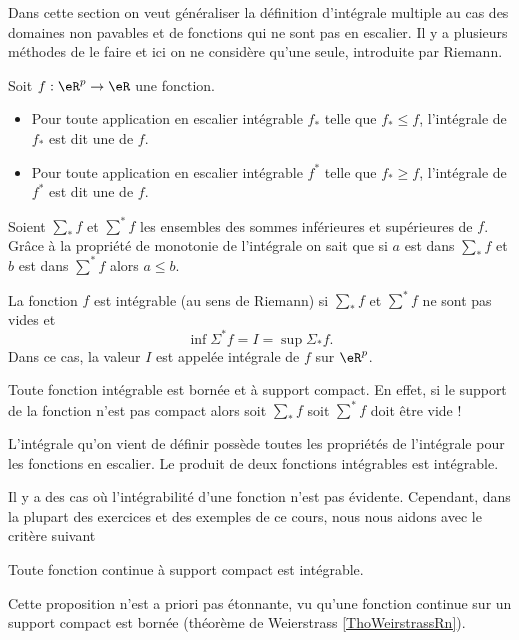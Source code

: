 Dans cette section on veut généraliser la définition d'intégrale multiple au cas des domaines non pavables et de fonctions qui ne sont pas en escalier. Il y a plusieurs méthodes de le faire et ici on ne considère qu'une seule, introduite par Riemann.  
\begin{definition} Soit $f: \eR^p\to \eR$ une fonction.
  \begin{itemize}
	  \item Pour toute application en escalier intégrable $f_*$ telle que $f_*\leq f$, l'intégrale de $f_*$ est dit une  de $f$. 
	  \item Pour toute application en escalier intégrable $f^*$ telle que $f_*\geq f$, l'intégrale de $f^*$ est dit une  de $f$. 
  \end{itemize}
\end{definition}
Soient $\sum_* f$ et  $\sum^* f$ les ensembles des sommes inférieures et supérieures de $f$. Grâce à la propriété de  monotonie de l'intégrale on sait que si $a$ est dans $\sum_* f$ et  $b$ est dans $\sum^* f$ alors $a\leq b$. 
\begin{definition}
  La fonction $f$ est intégrable (au sens de Riemann) si $\sum_* f$ et  $\sum^* f$ ne sont pas vides et 
\[
\inf \Sigma^* f=I =\sup \Sigma_* f.
\] 
Dans ce cas, la valeur $I$ est appelée intégrale de $f$ sur $\eR^p$. 
\end{definition}
\begin{remark}
  Toute fonction intégrable est bornée et à support compact. En effet, si le support de la  fonction n'est pas compact alors soit $\sum_* f$ soit $\sum^* f$ doit être vide ! 
\end{remark}
L'intégrale qu'on vient de définir possède toutes les propriétés de l'intégrale pour les fonctions en escalier. Le produit de deux fonctions intégrables est intégrable. 

Il y a des cas où l'intégrabilité d'une fonction n'est pas évidente. Cependant, dans la plupart des exercices et des exemples de ce cours, nous nous aidons avec le critère suivant 
\begin{proposition}
  Toute fonction continue à support compact est intégrable. 
\end{proposition}
Cette proposition n'est a priori pas étonnante, vu qu'une fonction continue sur un support compact est bornée (théorème de Weierstrass \ref{ThoWeirstrassRn}).

